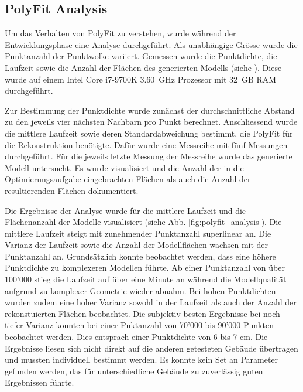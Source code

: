 \subsection{PolyFit Analysis}
\begin{German}
    Um das Verhalten von PolyFit zu verstehen, wurde während der Entwicklungsphase eine Analyse durchgeführt. Als unabhängige Grösse wurde die Punktanzahl der Punktwolke variiert. Gemessen wurde die Punktdichte, die Laufzeit sowie die Anzahl der Flächen des generierten Modells (siehe ). Diese wurde auf einem Intel Core i7-9700K 3.60~GHz Prozessor mit 32~GB RAM durchgeführt.
    
    Zur Bestimmung der Punktdichte wurde zunächst der durchschnittliche Abstand zu den jeweils vier nächsten Nachbarn pro Punkt berechnet. Anschliessend wurde die mittlere Laufzeit sowie deren Standardabweichung bestimmt, die PolyFit für die Rekonstruktion benötigte. Dafür wurde eine Messreihe mit fünf Messungen durchgeführt. Für die jeweils letzte Messung der Messreihe wurde das generierte Modell untersucht. Es wurde visualisiert und die Anzahl der in die Optimierungsaufgabe eingebrachten Flächen als auch die Anzahl der resultierenden Flächen dokumentiert.

    Die Ergebnisse der Analyse wurde für die mittlere Laufzeit und die Flächenanzahl der Modelle visualisiert (siehe Abb. \ref{fig:polyfit_analysis}). Die mittlere Laufzeit steigt mit zunehmender Punktanzahl superlinear an. Die Varianz der Laufzeit sowie die Anzahl der Modellflächen wachsen mit der Punktanzahl an. Grundsätzlich konnte beobachtet werden, dass eine höhere Punktdichte zu komplexeren Modellen führte. Ab einer Punktanzahl von über 100'000 stieg die Laufzeit auf über eine Minute an während die Modellqualität aufgrund zu komplexer Geometrie wieder abnahm. Bei hohen Punktdichten wurden zudem eine hoher Varianz sowohl in der Laufzeit als auch der Anzahl der rekonstuierten Flächen beobachtet. Die subjektiv besten Ergebnisse bei noch tiefer Varianz konnten bei einer Puktanzahl von 70'000 bis 90'000 Punkten beobachtet werden. Dies entsprach einer Punktdichte von 6 bis 7 cm. Die Ergebnisse liesen sich nicht direkt auf die anderen getesteten Gebäude übertragen und mussten individuell bestimmt werden. Es konnte kein Set an Parameter gefunden werden, das für unterschiedliche Gebäude zu zuverlässig guten Ergebnissen führte.
\end{German}

